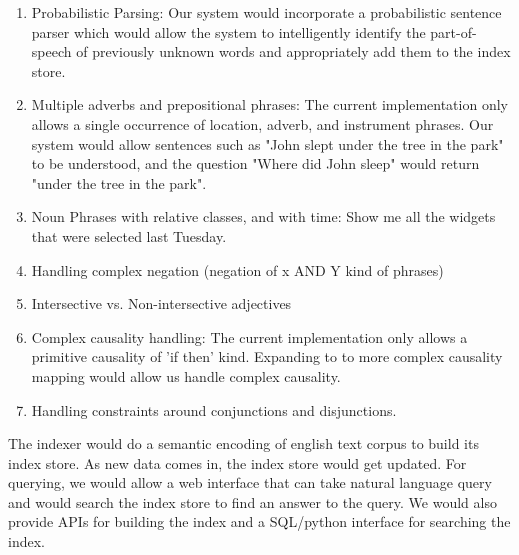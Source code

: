 \documentclass[10pt]{article}
\begin{document}
\begin{enumerate}
\item{
Probabilistic Parsing: Our system would incorporate a probabilistic sentence parser which would allow the system to intelligently identify the part-of-speech of previously unknown words and appropriately add them to the index store.
}

\item{
Multiple adverbs and prepositional phrases: The current implementation only allows a single occurrence of location, adverb, and instrument phrases. Our system would allow sentences such as "John slept under the tree in the park" to be understood, and the question "Where did John sleep" would return "under the tree in the park".
}

\item{
Noun Phrases with relative classes, and with time:  Show me all the widgets that were selected last Tuesday.
}

\item{
Handling complex negation (negation of x AND Y kind of phrases)
}

\item{
Intersective vs. Non-intersective adjectives
}

\item{
Complex causality handling: The current implementation only allows a primitive causality of 'if then' kind. Expanding to to more complex causality mapping would allow us handle complex causality.
}

\item{
Handling constraints around conjunctions and disjunctions.
}

\end{enumerate}
The indexer would do a semantic encoding of english text corpus to build its index store. As new data comes in, the index store would get updated. For querying, we would allow a web interface that can take natural language query and would search the index store to find an answer to the query. We would also provide APIs for building the index and a SQL/python interface for searching the index. 

 
\end{document}

